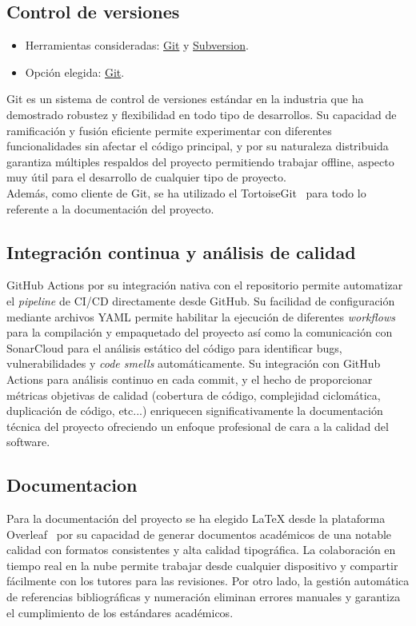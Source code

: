 \subsection{Control de versiones}\label{control-de-versiones}

\begin{itemize}
\tightlist
\item
  Herramientas consideradas: \href{https://git-scm.com/}{Git} y
  \href{https://subversion.apache.org/}{Subversion}.
\item
  Opción elegida: \href{https://git-scm.com/}{Git}.
\end{itemize}

Git es un sistema de control de versiones estándar en la industria que ha demostrado robustez y flexibilidad en todo tipo de desarrollos. Su capacidad de ramificación y fusión eficiente permite experimentar con diferentes funcionalidades sin afectar el código principal, y por su naturaleza distribuida garantiza múltiples respaldos del proyecto permitiendo trabajar offline, aspecto muy útil para el desarrollo de cualquier tipo de proyecto.\\
Además, como cliente de Git, se ha utilizado el TortoiseGit~\cite{tortoisegit} para todo lo referente a la documentación del proyecto.

\subsection{Integración continua y análisis de calidad}\label{integracion-continua-analisis-calidad}
GitHub Actions por su integración nativa con el repositorio permite automatizar el \emph{pipeline} de CI/CD directamente desde GitHub. Su facilidad de configuración mediante archivos YAML permite habilitar la ejecución de diferentes \emph{workflows} para la compilación y empaquetado del proyecto así como la comunicación con SonarCloud para el análisis estático del código para identificar bugs, vulnerabilidades y \emph{code smells} automáticamente. Su integración con GitHub Actions para análisis continuo en cada commit, y el hecho de proporcionar métricas objetivas de calidad (cobertura de código, complejidad ciclomática, duplicación de código, etc...) enriquecen significativamente la documentación técnica del proyecto ofreciendo un enfoque profesional de cara a la calidad del software.

\subsection{Documentacion}\label{documentacion}
Para la documentación del proyecto se ha elegido \LaTeX{} desde la plataforma Overleaf~\cite{overleaf} por su capacidad de generar documentos académicos de una notable calidad con formatos consistentes y alta calidad tipográfica. La colaboración en tiempo real en la nube permite trabajar desde cualquier dispositivo y compartir fácilmente con los tutores para las revisiones. Por otro lado, la gestión automática de referencias bibliográficas y numeración eliminan errores manuales y garantiza el cumplimiento de los estándares académicos.

